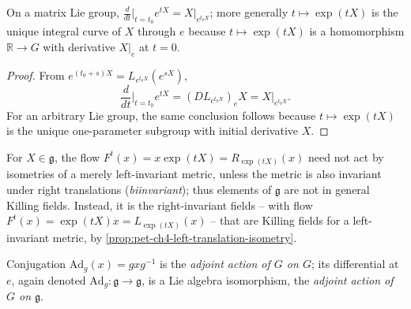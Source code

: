 \begin{proposition}
  \label{prop:pet-ch4-matrix-exp-integral-curve}


  On a matrix Lie group, $\tfrac{d}{dt}\big|_{t=t_0}e^{tX}=X|_{e^{t_0X}}$; more
  generally $t\mapsto\exp(tX)$ is the unique integral curve of $X$ through $e$
  because $t\mapsto\exp(tX)$ is a homomorphism $\mathbb{R}\to G$ with derivative
  $X|_e$ at $t=0$.
\end{proposition}
\begin{proof}

  \sketch
  From $e^{(t_0+s)X}=L_{e^{t_0X}}(e^{sX})$,
  \[
    \frac d{dt}\Big|_{t=t_0}e^{tX}
    =(DL_{e^{t_0X}})_eX=X|_{e^{t_0X}}.
  \]
  For an arbitrary Lie group, the same conclusion follows because
  $t\mapsto\exp(tX)$ is the unique one-parameter subgroup with initial
  derivative $X$.
\end{proof}

\begin{remark}
  \label{rem:pet-ch4-flow-right-invariant-killing}

  For $X\in\mathfrak g$, the flow $F^t(x)=x\exp(tX)=R_{\exp(tX)}(x)$ need not
  act by isometries of a merely left-invariant metric, unless the metric is
  also invariant under right translations (\emph{biinvariant}); thus elements
  of $\mathfrak g$ are not in general Killing fields. Instead, it is the
  right-invariant fields -- with flow
  $F^t(x)=\exp(tX)x=L_{\exp(tX)}(x)$ -- that are Killing fields for a
  left-invariant metric, by \cref{prop:pet-ch4-left-translation-isometry}.
\end{remark}

\begin{definition}
  \label{def:pet-ch4-adjoint-action}


  Conjugation $\mathrm{Ad}_g(x)=gxg^{-1}$ is the \emph{adjoint action of $G$ on
  $G$}; its differential at $e$, again denoted $\mathrm{Ad}_g:\mathfrak g\to\mathfrak g$,
  is a Lie algebra isomorphism, the \emph{adjoint action of $G$ on $\mathfrak g$}.
\end{definition}


